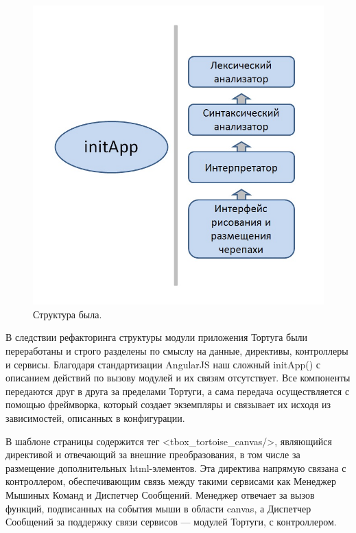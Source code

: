 \vspace{6mm}
\begin{figure} [h] 
  \center
  \includegraphics [scale=0.50,natwidth=826,natheight=645] {images/struct_old.jpg}
  \caption{Структура была.} 
  \label{img:struct_old}  
\end{figure}
\vspace{6mm}

В следствии рефакторинга структуры модули приложения Тортуга были переработаны и строго разделены по смыслу на данные, директивы, контроллеры и сервисы. Благодаря стандартизации AngularJS наш сложный initApp() с описанием действий по вызову модулей  и их связям отсутствует. Все компоненты передаются друг в друга за пределами Тортуги, а сама передача осуществляется с помощью фреймворка, который создает экземпляры и связывает их исходя из зависимостей, описанных в конфигурации.

В шаблоне страницы содержится тег <tbox\_tortoise\_canvas/>, являющийся директивой  и отвечающий за внешние преобразования, в том числе за размещение дополнительных html-элементов. Эта директива напрямую связана с контроллером, обеспечивающим связь между такими сервисами как Менеджер Мышиных Команд  и Диспетчер Сообщений. Менеджер отвечает за вызов функций, подписанных на события мыши в области canvas, а Диспетчер Сообщений за поддержку связи сервисов --- модулей Тортуги, с контроллером.

